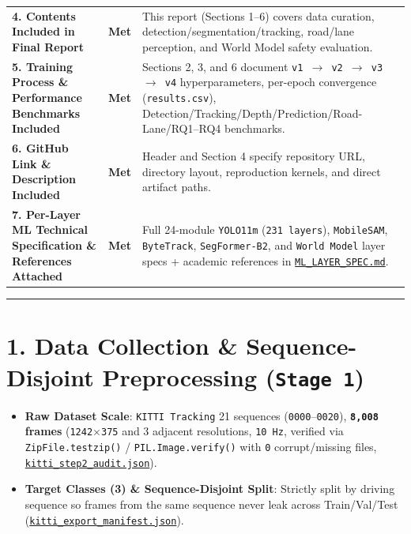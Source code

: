 \documentclass[10.5pt,a4paper]{article}
\begin{document}
\begin{footnotesize}
\begin{longtable}{>{\raggedright\arraybackslash}p{} >{\raggedright\arraybackslash}p{} >{\raggedright\arraybackslash}p{}}
\textbf{4. Contents Included in Final Report} & \textbf{Met} & This report (Sections 1--6) covers data curation, detection/segmentation/tracking, road/lane perception, and World Model safety evaluation. \\
\textbf{5. Training Process \& Performance Benchmarks Included} & \textbf{Met} & Sections 2, 3, and 6 document \texttt{v1 $\rightarrow$ v2 $\rightarrow$ v3 $\rightarrow$ v4} hyperparameters, per-epoch convergence (\texttt{results.\allowbreak{}csv}), Detection/Tracking/Depth/Prediction/Road-Lane/RQ1--RQ4 benchmarks. \\
\textbf{6. GitHub Link \& Description Included} & \textbf{Met} & Header and Section 4 specify repository URL, directory layout, reproduction kernels, and direct artifact paths. \\
\textbf{7. Per-Layer ML Technical Specification \& References Attached} & \textbf{Met} & Full 24-module \texttt{YOLO11m} (\texttt{231 layers}), \texttt{MobileSAM}, \texttt{ByteTrack}, \texttt{SegFormer-\allowbreak{}B2}, and \texttt{World Model} layer specs + academic references in \href{https://github.com/Heisnotanimposter/Totalcare\_autonomous\_driving\_Yolov5/blob/main/ML\_LAYER\_SPEC.md}{\texttt{ML\_\allowbreak{}LAYER\_\allowbreak{}SPEC.\allowbreak{}md}}. \\
\end{longtable}
\end{footnotesize}


\par\noindent\rule{\textwidth}{0.4pt}\par\medskip

\section{1. Data Collection \& Sequence-Disjoint Preprocessing (\texttt{Stage 1})}

\begin{itemize}[leftmargin=1.5em,itemsep=2pt]
\item \textbf{Raw Dataset Scale}: \texttt{KITTI Tracking} 21 sequences (\texttt{0000}--\texttt{0020}), \textbf{\texttt{8,\allowbreak{}008} frames} (\texttt{1242$\times$375} and 3 adjacent resolutions, \texttt{10 Hz}, verified via \texttt{ZipFile.\allowbreak{}testzip()} / \texttt{PIL.\allowbreak{}Image.\allowbreak{}verify()} with \texttt{0} corrupt/missing files, \href{https://github.com/Heisnotanimposter/Totalcare\_autonomous\_driving\_Yolov5/blob/main/results/v2\_improved/outputs/kitti\_step2\_audit.json}{\texttt{kitti\_\allowbreak{}step2\_\allowbreak{}audit.\allowbreak{}json}}).
\item \textbf{Target Classes (3) \& Sequence-Disjoint Split}: Strictly split by driving sequence so frames from the same sequence never leak across Train/Val/Test (\href{https://github.com/Heisnotanimposter/Totalcare\_autonomous\_driving\_Yolov5/blob/main/results/v2\_improved/outputs/kitti\_export\_manifest.json}{\texttt{kitti\_\allowbreak{}export\_\allowbreak{}manifest.\allowbreak{}json}}).
\end{itemize}
\end{document}

